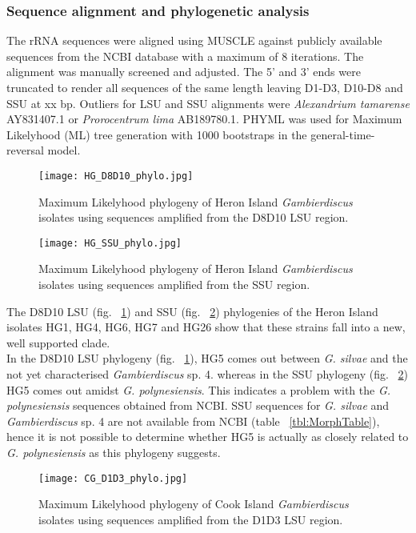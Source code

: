 \documentclass[12pt]{article}
\begin{document}
\subsubsection{Sequence alignment and phylogenetic analysis}
The rRNA sequences were aligned using MUSCLE against publicly available sequences from the NCBI database with a maximum of 8 iterations. The alignment was manually screened and adjusted. The 5' and 3' ends were truncated to render all sequences of the same length leaving D1-D3, D10-D8 and SSU at xx bp. Outliers for LSU and SSU alignments were \emph{Alexandrium tamarense} AY831407.1 or \emph{Prorocentrum lima} AB189780.1.
PHYML was used for Maximum Likelyhood (ML) tree generation with 1000 bootstraps in the general-time-reversal model. \\



\begin{figure} 
\texttt{[image: HG\_D8D10\_phylo.jpg]} 
\caption{Maximum Likelyhood phylogeny of Heron Island \textit{Gambierdiscus} isolates using sequences amplified from the D8D10 LSU region.} 
\label{fig:HGD8D10}
\end{figure} 
\FloatBarrier 
\newpage

\begin{figure} 
\texttt{[image: HG\_SSU\_phylo.jpg]} 
\caption{Maximum Likelyhood phylogeny of Heron Island \textit{Gambierdiscus} isolates using sequences amplified from the SSU region.}
\label{fig:HGSSU} 
\end{figure} 
\FloatBarrier 
\newpage

The D8D10 LSU (fig. ~\ref{fig:HGD8D10}) and SSU (fig. ~\ref{fig:HGSSU}) phylogenies of the Heron Island isolates HG1, HG4, HG6, HG7 and HG26 show that these strains fall into a new, well supported clade.\\
In the D8D10 LSU phylogeny (fig. ~\ref{fig:HGD8D10}), HG5 comes out between \emph{G. silvae} and the not yet characterised \emph{Gambierdiscus} sp. 4. whereas in the SSU phylogeny (fig. ~\ref{fig:HGSSU}) HG5 comes out amidst \emph{G. polynesiensis}. This indicates a problem with the \emph{G. polynesiensis} sequences obtained from NCBI. SSU sequences for \emph{G. silvae} and \emph{Gambierdiscus} sp. 4 are not available from NCBI (table ~\ref{tbl:MorphTable}), hence it is not possible to determine whether HG5 is actually as closely related to \emph{G. polynesiensis} as this phylogeny suggests.\\

\begin{figure} 
\texttt{[image: CG\_D1D3\_phylo.jpg]} 
\caption{Maximum Likelyhood phylogeny of Cook Island \textit{Gambierdiscus} isolates using sequences amplified from the D1D3 LSU region.} 
\label{fig:CGD1D3}
\end{figure} 
\FloatBarrier 
\newpage
\end{document}

